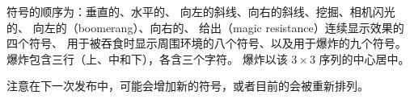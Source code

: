 \documentclass[a4paper, 10pt]{article}
\begin{document}
符号的顺序为：垂直的\zhTransBeam、水平的\zhTransBeam、
向左的斜线、向右的斜线、挖掘\zhTransBeam、相机闪光的\zhTransBeam、
向左的\zhTransBoomerang（boomerang）、向右的\zhTransBoomerang、
给出\zhTransMagicResistance{}（magic resistance）连续显示效果的四个符号、
用于被吞食时显示周围环境的八个符号、以及用于爆炸的九个符号。
爆炸包含三行（上、中和下），各含三个字符。
爆炸以该 $3 \times 3$ 序列的中心居中。

注意在下一次发布中，可能会增加新的符号，或者目前的会被重新排列。
\end{document}
